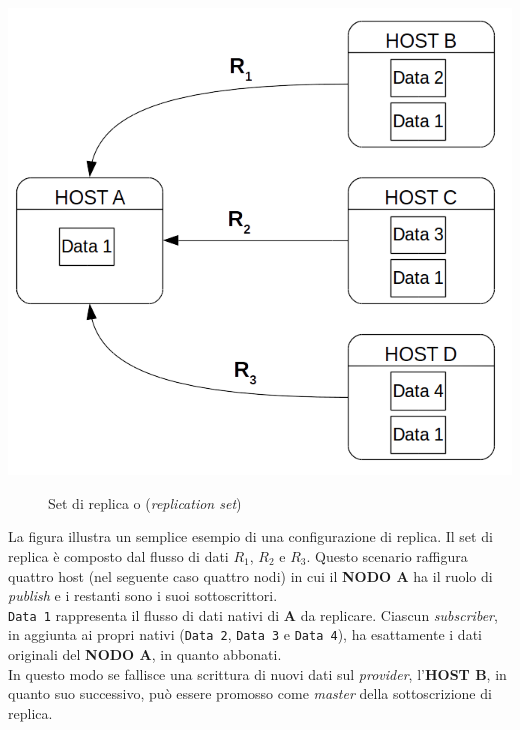 \begin{center}
\includegraphics[scale=0.60]{img/setreplica.png}
\end{center}
\begin{figure}[htbp]
\caption{Set di replica o (\textit{replication set}) \label{figura1.15}}
\end{figure}

La figura illustra un semplice esempio di una configurazione di replica. Il set di replica \`{e} composto dal flusso di dati $R_1$, $R_2$ e $R_3$.
Questo scenario raffigura quattro host (nel seguente caso quattro nodi) in cui il \textbf{NODO A} ha il ruolo di \textit{publish} e i restanti sono i suoi sottoscrittori.\\
\verb"Data 1" rappresenta il flusso di dati nativi di \textbf{A} da replicare. Ciascun \textit{subscriber}, in aggiunta ai propri nativi (\verb"Data 2", \verb"Data 3" e \verb"Data 4"), ha esattamente i dati originali del \textbf{NODO A}, in quanto abbonati. \\
In questo modo se fallisce una scrittura di nuovi dati sul \textit{provider}, l'\textbf{HOST B}, in quanto suo successivo, pu\`{o} essere promosso come \textit{master} della sottoscrizione di replica.
